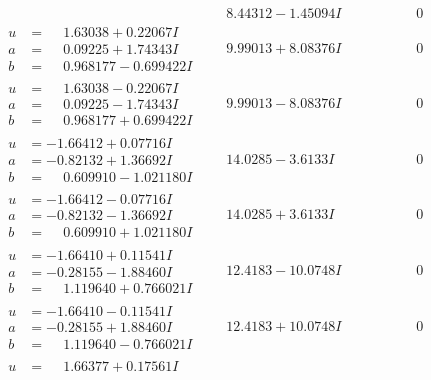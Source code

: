 \documentclass[1p]{elsarticle_modified}
\theoremstyle{definition}
\begin{document}
$$\begin{array}{c|c|c}
 & \phantom{-}8.44312 - 1.45094 I & \phantom{-0.000000 } 0 \\ \hline\begin{aligned}
u &= \phantom{-}1.63038 + 0.22067 I \\
a &= \phantom{-}0.09225 + 1.74343 I \\
b &= \phantom{-}0.968177 - 0.699422 I\end{aligned}
 & \phantom{-}9.99013 + 8.08376 I & \phantom{-0.000000 } 0 \\ \hline\begin{aligned}
u &= \phantom{-}1.63038 - 0.22067 I \\
a &= \phantom{-}0.09225 - 1.74343 I \\
b &= \phantom{-}0.968177 + 0.699422 I\end{aligned}
 & \phantom{-}9.99013 - 8.08376 I & \phantom{-0.000000 } 0 \\ \hline\begin{aligned}
u &= -1.66412 + 0.07716 I \\
a &= -0.82132 + 1.36692 I \\
b &= \phantom{-}0.609910 - 1.021180 I\end{aligned}
 & \phantom{-}14.0285 - 3.6133 I & \phantom{-0.000000 } 0 \\ \hline\begin{aligned}
u &= -1.66412 - 0.07716 I \\
a &= -0.82132 - 1.36692 I \\
b &= \phantom{-}0.609910 + 1.021180 I\end{aligned}
 & \phantom{-}14.0285 + 3.6133 I & \phantom{-0.000000 } 0 \\ \hline\begin{aligned}
u &= -1.66410 + 0.11541 I \\
a &= -0.28155 - 1.88460 I \\
b &= \phantom{-}1.119640 + 0.766021 I\end{aligned}
 & \phantom{-}12.4183 - 10.0748 I & \phantom{-0.000000 } 0 \\ \hline\begin{aligned}
u &= -1.66410 - 0.11541 I \\
a &= -0.28155 + 1.88460 I \\
b &= \phantom{-}1.119640 - 0.766021 I\end{aligned}
 & \phantom{-}12.4183 + 10.0748 I & \phantom{-0.000000 } 0 \\ \hline\begin{aligned}
u &= \phantom{-}1.66377 + 0.17561 I \\

\end{aligned}
\end{array}$$
\end{document}
